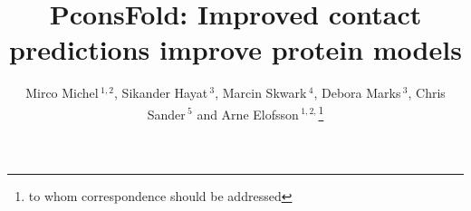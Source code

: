 \documentclass{bioinfo}
\begin{document}

\title[PconsFold]{PconsFold: Improved contact predictions improve
 protein models}
\author[M.Michel \textit{et~al}]{Mirco Michel\,$^{1,2}$, Sikander Hayat\,$^{3}$, Marcin Skwark\,$^{4}$, Debora Marks\,$^{3}$, Chris Sander\,$^{5}$ and Arne Elofsson\,$^{1,2,}$\footnote{to whom correspondence should be addressed}}
\address{$^{1}$Department of Biochemistry and Biophysics, Stockholm University, 10691 Stockholm, Sweden, 
$^{2}$Science for Life Laboratory, Box 1031, 17121 Solna, Sweden, 
$^{3}$Department of Systems Biology, Harvard Medical School, Boston, Massachusetts, USA, 
$^{4}$Department of Information and Computer Science, Aalto University, PO Box 15400, FI-00076 Aalto, Finland, and
$^{5}$Computational Biology Center, Memorial Sloan-Kettering Cancer Center, New York, New York, USA}



\maketitle
\end{document}
